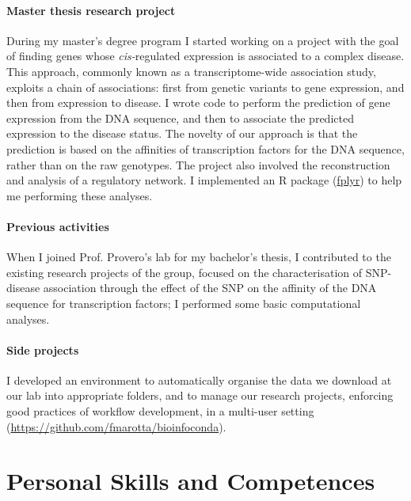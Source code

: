 \documentclass[10pt]{article} %
\begin{document}
\paragraph{Master thesis research project}

During my master's degree program I started working on a project with the goal of finding genes whose \textit{cis-}regulated expression is associated to a complex disease. This approach, commonly known as a transcriptome-wide association study, exploits a chain of associations: first from genetic variants to gene expression, and then from expression to disease. I wrote code to perform the prediction of gene expression from the DNA sequence, and then to associate the predicted expression to the disease status. The novelty of our approach is that the prediction is based on the affinities of transcription factors for the DNA sequence, rather than on the raw genotypes. The project also involved the reconstruction and analysis of a regulatory network. I implemented an R package (\href{https://cran.r-project.org/web/packages/fplyr/index.html}{fplyr}) to help me performing these analyses.

\paragraph{Previous activities} When I joined Prof. Provero's lab for my bachelor's thesis, I contributed to the existing research projects of the group, focused on the characterisation of SNP-disease association through the effect of the SNP on the affinity of the DNA sequence for transcription factors; I performed some basic computational analyses.

\paragraph{Side projects} I developed an environment to automatically organise the data we download at our lab into appropriate folders, and to manage our research projects, enforcing good practices of workflow development, in a multi-user setting (\href{https://github.com/fmarotta/bioinfoconda}{https://github.com/fmarotta/bioinfoconda}).


\section{Personal Skills and Competences}
\end{document}
